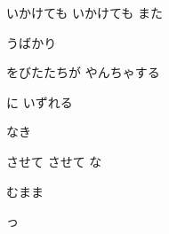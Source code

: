 \documentclass[a4paper,tate,twocolumn,12pt]{ltjtarticle}
\begin{document}
\begin{flushleft}
\vspace{2em}

\noindent\begin{minipage}{\linewidth}
いかけても いかけても また

 うばかり

をびたたちが やんちゃする

に いずれる

なき

させて させて な

 むまま

っ
\end{minipage}

\end{flushleft}
\end{document}
